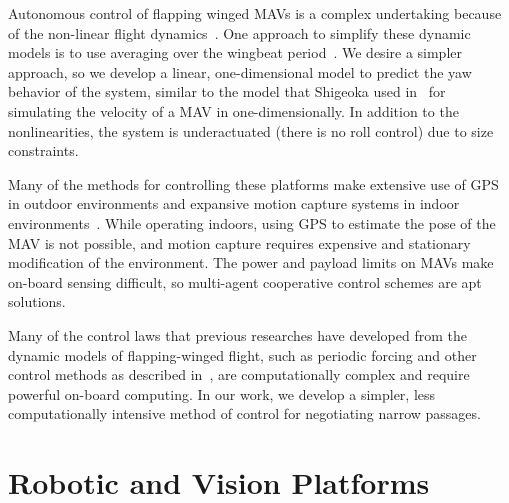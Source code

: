 \documentclass{aamas2013}
\begin{document}
Autonomous control of flapping winged MAVs is a complex undertaking because of
the non-linear flight
dynamics~\cite{humbert:dipteran2}\cite{cheng:tandrdamping}. One approach to
simplify these dynamic models is to use averaging over the wingbeat
period~\cite{Schenato:flightcontrol}\cite{cheng:tandrdamping}. We desire a
simpler approach, so we develop a linear, one-dimensional model to predict the
yaw behavior of the system, similar to the model that Shigeoka used
in~\cite{Shigeoka:ornithopter} for simulating the velocity of a MAV in
one-dimensionally. In addition to the nonlinearities, the system is
underactuated (there is no roll control) due to size constraints.

Many of the methods for
controlling these platforms make extensive use of GPS in outdoor
environments and expansive
motion capture systems in indoor environments~\cite{kingston:timeattitude}\cite{kanade:3dvision}. While operating indoors, using
GPS to estimate the pose of the MAV is not possible, and motion capture
requires expensive and stationary modification of the environment. The power
and payload limits on MAVs make on-board sensing difficult, so multi-agent
cooperative control schemes are apt solutions.

Many of the control laws that previous researches have developed from the
dynamic models of flapping-winged flight, such as periodic forcing and other
control methods as described %
in~\cite{doman:dynamics}\cite{khan:longitudinal_control}\cite{leonard:averaging}, are computationally complex and
require powerful on-board computing. In our work, we develop a simpler, less
computationally intensive method of control for negotiating narrow passages.

\section{Robotic and Vision Platforms}

\end{document}
